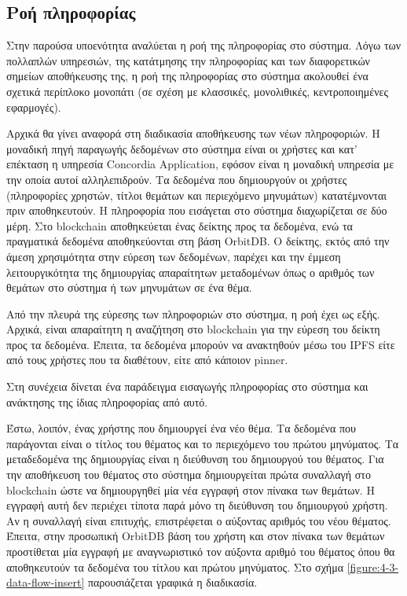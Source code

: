 \subsection{Ροή πληροφορίας} \label{subsection:4-3-9-data-flow}

Στην παρούσα υποενότητα αναλύεται η ροή της πληροφορίας στο σύστημα. Λόγω των πολλαπλών υπηρεσιών, της κατάτμησης την πληροφορίας και των διαφορετικών σημείων αποθήκευσης της, η ροή της πληροφορίας στο σύστημα ακολουθεί ένα σχετικά περίπλοκο μονοπάτι (σε σχέση με κλασσικές, μονολιθικές, κεντροποιημένες εφαρμογές).

Αρχικά θα γίνει αναφορά στη διαδικασία αποθήκευσης των νέων πληροφοριών. Η μοναδική πηγή παραγωγής δεδομένων στο σύστημα είναι οι χρήστες και κατ' επέκταση η υπηρεσία Concordia Application, εφόσον είναι η μοναδική υπηρεσία με την οποία αυτοί αλληλεπιδρούν. Τα δεδομένα που δημιουργούν οι χρήστες (πληροφορίες χρηστών, τίτλοι θεμάτων και περιεχόμενο μηνυμάτων) κατατέμνονται πριν αποθηκευτούν. Η πληροφορία που εισάγεται στο σύστημα διαχωρίζεται σε δύο μέρη. Στο blockchain αποθηκεύεται ένας δείκτης προς τα δεδομένα, ενώ τα πραγματικά δεδομένα αποθηκεύονται στη βάση OrbitDB. Ο δείκτης, εκτός από την άμεση χρησιμότητα στην εύρεση των δεδομένων, παρέχει και την έμμεση λειτουργικότητα της δημιουργίας απαραίτητων μεταδομένων όπως ο αριθμός των θεμάτων στο σύστημα ή των μηνυμάτων σε ένα θέμα.

Από την πλευρά της εύρεσης των πληροφοριών στο σύστημα, η ροή έχει ως εξής. Αρχικά, είναι απαραίτητη η αναζήτηση στο blockchain για την εύρεση του δείκτη προς τα δεδομένα. Έπειτα, τα δεδομένα μπορούν να ανακτηθούν μέσω του IPFS είτε από τους χρήστες που τα διαθέτουν, είτε από κάποιον pinner.

Στη συνέχεια δίνεται ένα παράδειγμα εισαγωγής πληροφορίας στο σύστημα και ανάκτησης της ίδιας πληροφορίας από αυτό.

Έστω, λοιπόν, ένας χρήστης που δημιουργεί ένα νέο θέμα. Τα δεδομένα που παράγονται είναι ο τίτλος του θέματος και το περιεχόμενο του πρώτου μηνύματος. Τα μεταδεδομένα της δημιουργίας είναι η διεύθυνση του δημιουργού του θέματος. Για την αποθήκευση του θέματος στο σύστημα δημιουργείται πρώτα συναλλαγή στο blockchain ώστε να δημιουργηθεί μία νέα εγγραφή στον πίνακα των θεμάτων. Η εγγραφή αυτή δεν περιέχει τίποτα παρά μόνο τη διεύθυνση του δημιουργού χρήστη. Αν η συναλλαγή είναι επιτυχής, επιστρέφεται ο αύξοντας αριθμός του νέου θέματος. Έπειτα, στην προσωπική OrbitDB βάση του χρήστη και στον πίνακα των θεμάτων προστίθεται μία εγγραφή με αναγνωριστικό τον αύξοντα αριθμό του θέματος όπου θα αποθηκευτούν τα δεδομένα του τίτλου και πρώτου μηνύματος. Στο σχήμα \ref{figure:4-3-data-flow-insert} παρουσιάζεται γραφικά η διαδικασία.

